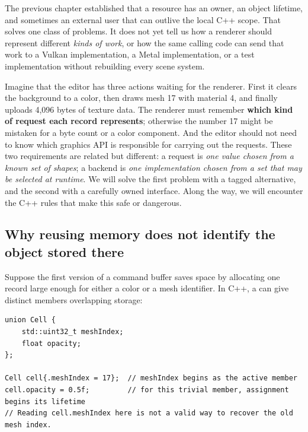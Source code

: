 \hypertarget{05-engine-i-ch004-from-one-owned-resource-to-many-requests-and-a-replaceable-backend}{}

The previous chapter established that a resource has an owner, an object lifetime, and sometimes an external user that can outlive the local C++ scope. That solves one class of problems. It does not yet tell us how a renderer should represent different \emph{kinds of work}, or how the same calling code can send that work to a Vulkan implementation, a Metal implementation, or a test implementation without rebuilding every scene system.

Imagine that the editor has three actions waiting for the renderer. First it clears the background to a color, then draws mesh 17 with material 4, and finally uploads 4,096 bytes of texture data. The renderer must remember \textbf{which kind of request each record represents}; otherwise the number 17 might be mistaken for a byte count or a color component. And the editor should not need to know which graphics API is responsible for carrying out the requests. These two requirements are related but different: a request is \emph{one value chosen from a known set of shapes}; a backend is \emph{one implementation chosen from a set that may be selected at runtime}. We will solve the first problem with a tagged alternative, and the second with a carefully owned interface. Along the way, we will encounter the C++ rules that make this safe or dangerous.

\subsection{Why reusing memory does not identify the object stored there}\label{05-engine-i-ch004-why-reusing-memory-does-not-identify-the-object-stored-there}

\hypertarget{05-engine-i-ch004-why-reusing-memory-does-not-identify-the-object-stored-there}{}

Suppose the first version of a command buffer saves space by allocating one record large enough for either a color or a mesh identifier. In C++, a  can give distinct members overlapping storage:

\begin{verbatim}
union Cell {
    std::uint32_t meshIndex;
    float opacity;
};

Cell cell{.meshIndex = 17};  // meshIndex begins as the active member
cell.opacity = 0.5f;         // for this trivial member, assignment begins its lifetime
// Reading cell.meshIndex here is not a valid way to recover the old mesh index.
\end{verbatim}

